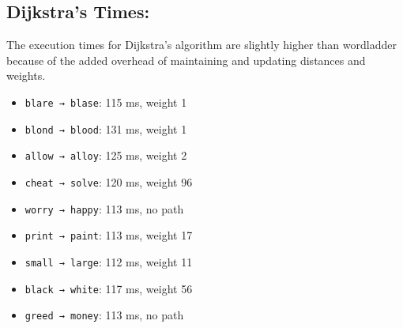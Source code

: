 \documentclass{article}
\begin{document}
\subsection*{Dijkstra's Times:}
The execution times for Dijkstra's algorithm are slightly higher than wordladder because of the added overhead of maintaining and updating distances and weights.
\begin{itemize}
    \item \texttt{blare → blase}: 115 ms, weight 1
    \item \texttt{blond → blood}: 131 ms, weight 1
    \item \texttt{allow → alloy}: 125 ms, weight 2
    \item \texttt{cheat → solve}: 120 ms, weight 96
    \item \texttt{worry → happy}: 113 ms, no path
    \item \texttt{print → paint}: 113 ms, weight 17
    \item \texttt{small → large}: 112 ms, weight 11
    \item \texttt{black → white}: 117 ms, weight 56
    \item \texttt{greed → money}: 113 ms, no path
\end{itemize}
\end{document}
